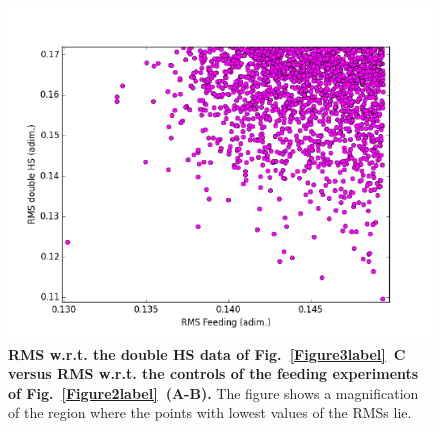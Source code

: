 \documentclass[oneside, 10pt, a4paper, twocolumn]{article}
\begin{document}
\begin{figure}
\centering
\includegraphics[width=\columnwidth]{Figure6_SupMat.pdf}
\caption{\small{\textbf{RMS w.r.t. the double HS data of Fig.~\ref{Figure3label}~C versus RMS w.r.t. the controls of the feeding experiments of Fig.~\ref{Figure2label}~(A-B).} The figure shows a magnification of the region where the points with lowest values of the RMSs lie.  %
}}
\label{Figure6label}
\end{figure}

\clearpage
\end{document}
